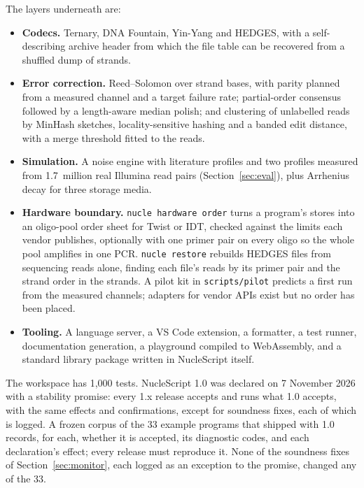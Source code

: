 \documentclass[11pt,a4paper]{article}
\newcommand{\nsl}[1]{\texttt{#1}}
\begin{document}
The layers underneath are:

\begin{itemize}[leftmargin=*,itemsep=2pt]
\item \textbf{Codecs.} Ternary, DNA Fountain, Yin-Yang and HEDGES, with a
  self-describing archive header from which the file table can be
  recovered from a shuffled dump of strands.
\item \textbf{Error correction.} Reed--Solomon over strand bases, with
  parity planned from a measured channel and a target failure rate;
  partial-order consensus followed by a length-aware median polish; and
  clustering of unlabelled reads by MinHash sketches, locality-sensitive
  hashing and a banded edit distance, with a merge threshold fitted to
  the reads.
\item \textbf{Simulation.} A noise engine with literature profiles and two
  profiles measured from 1.7~million real Illumina read pairs
  (Section~\ref{sec:eval}), plus Arrhenius decay for three storage media.
\item \textbf{Hardware boundary.} \nsl{nucle hardware order} turns a
  program's stores into an oligo-pool order sheet for Twist or IDT,
  checked against the limits each vendor publishes, optionally with one
  primer pair on every oligo so the whole pool amplifies in one PCR.
  \nsl{nucle restore} rebuilds HEDGES files from sequencing reads alone,
  finding each file's reads by its primer pair and the strand order in
  the strands. A pilot kit in \texttt{scripts/pilot} predicts a first run
  from the measured channels; adapters for vendor APIs exist but no order
  has been placed.
\item \textbf{Tooling.} A language server, a VS Code extension, a
  formatter, a test runner, documentation generation, a playground
  compiled to WebAssembly, and a standard library package written in
  NucleScript itself.
\end{itemize}

The workspace has 1,000 tests. NucleScript 1.0 was declared on 7 November
2026 with a stability promise: every 1.x release accepts and runs what
1.0 accepts, with the same effects and confirmations, except for
soundness fixes, each of which is logged. A frozen corpus of the 33
example programs that shipped with 1.0 records, for each, whether it is
accepted, its diagnostic codes, and each declaration's effect; every
release must reproduce it. None of the soundness fixes of
Section~\ref{sec:monitor}, each logged as an exception to the promise,
changed any of the 33.
\end{document}
